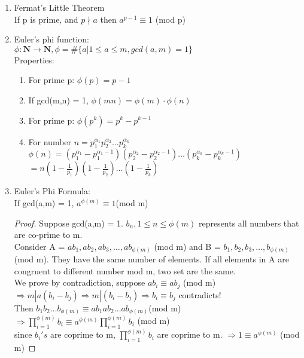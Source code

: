 \documentclass[10pt]{article}
\begin{document}
\begin{multicols}{2}
\begin{enumerate}
	\item Fermat's Little Theorem\\
	If p is prime, and $p \nmid a$ then $a^{p-1}\equiv 1$ (mod p)
	\item Euler's phi function:\\
	$\phi: \mathbf{N} \rightarrow \mathbf{N}, \phi = \# \{ a | 1 \le a \le m ,gcd(a,m) = 1 \}$\\
	Properties:
	\begin{enumerate}
		\item For prime p: $\phi(p) = p-1$
		\item If gcd(m,n) = 1, $\phi(mn) = \phi(m)\cdot \phi(n)$
		\item For prime p: $\phi(p^k) = p^k - p^{k-1}$
		\item For number $n =p_1^{\alpha_1}p_2^{\alpha_2} \dots p_k^{\alpha_k}$\\
		$\phi(n) = (p_1^{\alpha_1} - p_1^{\alpha_1-1})(p_2^{\alpha_2} - p_2^{\alpha_2-1})\dots (p_k^{\alpha_k} - p_k^{\alpha_k-1})$\\
		$= n(1-\frac{1}{p_1})(1-\frac{1}{p_2})\dots (1-\frac{1}{p_k})$ 
	\end{enumerate}
	
	\item Euler's Phi Formula:\\
	If gcd(a,m) = 1, $a^{\phi(m)}\equiv 1$(mod m)
	\begin{proof}
		Suppose gcd(a,m) = 1. $b_n, 1 \le n \le \phi(m)$ represents all numbers that are co-prime to m.\\
		Consider A = $ab_1, ab_2, ab_3, \dots, ab_{\phi(m)}$ (mod m) and B = $b_1, b_2, b_3,\dots,b_{\phi(m)}$ (mod m). They have the same number of elements. If all elements in A are congruent to different number mod m, two set are the same.\\
		We prove by contradiction, suppose $ab_i \equiv ab_j$ (mod m)$\Rightarrow m | a(b_i - b_j)\Rightarrow m|(b_i - b_j)\Rightarrow b_i \equiv b_j$ contradicts!\\
		Then $b_1b_2\dots b_{\phi(m)} \equiv ab_1ab_2 \dots ab_{\phi(m)}$(mod m)\\ $\Rightarrow \prod_{i = 1}^{\phi(m)}b_i \equiv a^{\phi(m)}\prod_{i = 1}^{\phi(m)}b_i$ (mod m)\\
		since $b_i's$ are coprime to m, $\prod_{i = 1}^{\phi(m)}b_i$ are coprime to m.
		$\Rightarrow 1 \equiv a^{\phi(m)}$ (mod m)
	\end{proof}
	

\end{enumerate}
\end{multicols}
\end{document}
